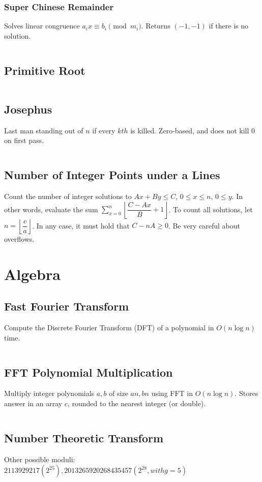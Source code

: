 \documentclass[8pt,a4paper,landscape,oneside]{amsart}
\newcommand{\code}[1]{\inputminted[fontsize=\normalsize,baselinestretch=1]{cpp}{_code/#1}}
\begin{document}
\begin{multicols*}{3}
    \subsubsection{Super Chinese Remainder}
      Solves linear congruence $a_i x \equiv b_i \pmod {m_i}$. Returns $(-1,-1)$ if there is no solution.
      \code{numtheory/super-crt.cpp}
  \subsection{Primitive Root}
    \code{numtheory/primitive_root.cpp}
  \subsection{Josephus}
    Last man standing out of $n$ if every $kth$ is killed. Zero-based, and does not kill $0$ on first pass.
    \code{numtheory/josephus.cpp}
  \subsection{Number of Integer Points under a Lines}
    Count the number of integer solutions to $Ax+By \leq C$, $0 \leq x \leq n$,
    $0 \leq y$. In other words, evaluate the sum $\sum_{x=0}^n\left\lfloor\dfrac{C-Ax}{B}+1\right\rfloor$.
    To count all solutions, let $n = \left\lfloor\dfrac{c}{a}\right\rfloor$.
    In any case, it must hold that $C-nA \geq 0$. Be very careful about overflows.
\section{Algebra}
  \subsection{Fast Fourier Transform}
    Compute the Discrete Fourier Transform (DFT) of a polynomial in $O(n \log n)$ time.
    \code{algebra/fft.cpp}
  \subsection{FFT Polynomial Multiplication}
    Multiply integer polynomials $a, b$ of size $an, bn$ using FFT in $O(n \log n)$. Stores answer in an array $c$, rounded to the nearest integer (or double).
    \code{algebra/fft-poly-mul.cpp}
  \subsection{Number Theoretic Transform}
    Other possible moduli: $2 113 929 217 (2^{25}), 2 013 265 920 268 435 457 (2^{28}, with g = 5)$
    \code{algebra/ntt.cpp}

\end{multicols*}
\end{document}
